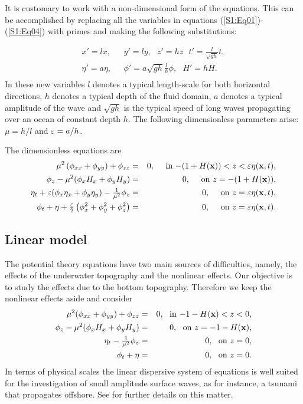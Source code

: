It is customary to work with a non-dimensional form of the equations. This can be accomplished by replacing all the variables in equations (\ref{S1:Eq01})-(\ref{S1:Eq04}) with primes  and  making the following substitutions:

\begin{equation}\label{S1:Eq07}
\begin{aligned}
x' = lx, \ \ \ & y' = ly, \ \ \ z' = hz \ \ \ t' = \frac{l}{\sqrt{gh}}t,\\
\eta' = a\eta,\ \ \ & \phi' = a\sqrt{gh}\frac{l}{h}\phi, \ \ \ H' = hH.\\
\end{aligned}
\end{equation}
In these new variables $l$ denotes a typical length-scale for both horizontal directions, $h$ denotes a typical depth of the fluid domain, $a$ denotes a typical amplitude of the wave and $\sqrt{gh}$ is the typical speed of long waves propagating over an ocean of constant depth $h$. The following dimensionless parameters arise: $\mu = {h}/{l}$ and $\varepsilon = {a}/{h}$.

The dimensionless equations are 
\begin{eqnarray}
\mu^2\left(\phi_{xx}+\phi_{yy}\right)+\phi_{zz} &=& 0,\ \ \ \ \text{in $-(1+H(\x))<z<\ep\eta(\x,t)$,}\label{S2:Eq08}\\
\phi_z -\mu^2(\phi_{x}H_x+\phi_{y}H_y)&=&0,\ \ \ \ \text{on $z=-(1+H(\x))$,}\label{S2:Eq09}\\
\eta_{t} + \ep(\phi_x\eta_x + \phi_y\eta_y) - \tfrac{1}{\mu^2}\phi_z&=&0,\ \ \ \ \text{on $z = \ep\eta(\x,t)$,}\label{S2:Eq10}\\
\phi_t + \eta +\tfrac{\ep}{2}\left(\phi_x^2+\phi_y^2+\phi_z^2\right) &=&0,\ \ \ \ \text{on $z = \ep\eta(\x,t)$.}\label{S2:Eq11}
\end{eqnarray}


\subsection{Linear model}
The potential theory equations have two main sources of difficulties, namely, the effects of the underwater topography and the nonlinear effects. Our objective is to study the effects due to the bottom topography.  Therefore
we keep the nonlinear effects aside and consider 
\begin{eqnarray}
	\mu^2(\phi_{xx}+\phi_{yy})+\phi_{zz}&=& 0,\ \ \text{in $-1-H(\x)<z<0$,}\label{S2:Eq12}\\
	\phi_{z} - \mu^2(\phi_{x}H_x + \phi_{y}H_y) &=& 0,\ \ \text{on $z=-1-H(\x)$,}\label{S2:Eq13}\\
	\eta_t  - \tfrac{1}{\mu^2}\phi_z &=& 0 ,\ \ \text{on $z=0$,}\label{S2:Eq14}\\
	\phi_t + \eta  &=& 0,\ \ \text{on $z=0$.}\label{S2:Eq15}
\end{eqnarray}
In terms of physical scales the linear dispersive system of equations is well suited for the investigation of 
small amplitude surface waves,  as for instance, a tsunami that propagates offshore. 
See \citet{ArcasSegur} for further details on this matter.


